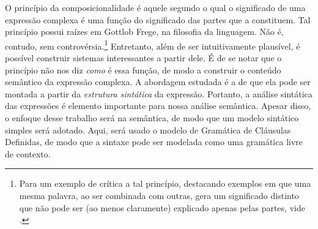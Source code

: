 \documentclass[12pt, a4paper, twoside]{article}
\begin{document}
O princípio da composicionalidade é aquele segundo o qual o significado de uma expressão complexa é uma função do significado das partes que a constituem. Tal princípio possui raízes em Gottlob Frege, na filosofia da linguagem. \cite[p.94]{BlackburnBos:2005} Não é, contudo, sem controvérsia.\footnote{Para um exemplo de crítica a tal princípio, destacando exemplos em que uma mesma palavra, ao ser combinada com outras, gera um significado distinto que não pode ser (ao menos claramente) explicado apenas pelas partes, vide \citet[pp.110, 151]{Manning:1999}.} Entretanto, além de ser intuitivamente plausível, é possível construir sistemas interessantes a partir dele. É de se notar que o princípio não nos diz \textit{como} é essa função, de modo a construir o conteúdo semântico da expressão complexa. A abordagem estudada é a de que ela pode ser montada a partir da \textit{estrutura sintática} da expressão. Portanto, a análise sintática das expressões é elemento importante para nossa análise semântica. Apesar disso, o enfoque desse trabalho será na semântica, de modo que um modelo sintático simples será adotado. Aqui, será usado o modelo de Gramática de Cláusulas Definidas, de modo que a sintaxe pode ser modelada como uma gramática livre de contexto.
\end{document}
